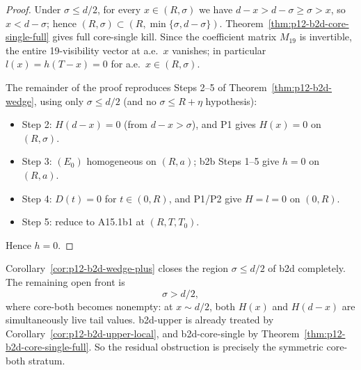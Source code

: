 \begin{proof}
Under $\sigma \le d/2$, for every $x \in (R, \sigma)$ we have
$d - x > d - \sigma \ge \sigma > x$, so $x < d - \sigma$; hence
$(R, \sigma) \subset (R, \min\{\sigma, d - \sigma\})$.
Theorem~\ref{thm:p12-b2d-core-single-full} gives full core-single
kill.  Since the coefficient matrix $M_{19}$ is invertible, the
entire 19-visibility vector at a.e.\ $x$ vanishes; in particular
$l(x) = h(T - x) = 0$ for a.e.\ $x \in (R, \sigma)$.

The remainder of the proof reproduces Steps 2--5 of
Theorem~\ref{thm:p12-b2d-wedge}, using only $\sigma \le d/2$ (and no
$\sigma \le R + \eta$ hypothesis):
\begin{itemize}
\item Step 2: $H(d - x) = 0$ (from $d - x > \sigma$), and P1 gives
  $H(x) = 0$ on $(R, \sigma)$.
\item Step 3: $(E_0)$ homogeneous on $(R, a)$; b2b Steps 1--5 give
  $h = 0$ on $(R, a)$.
\item Step 4: $D(t) = 0$ for $t \in (0, R)$, and P1/P2 give
  $H = l = 0$ on $(0, R)$.
\item Step 5: reduce to A15.1b1 at $(R, T, T_0)$.
\end{itemize}
Hence $h = 0$.
\end{proof}

\begin{remark}
\label{rem:p12-b2d-remaining}
Corollary~\ref{cor:p12-b2d-wedge-plus} closes the region
$\sigma \le d/2$ of b2d completely.  The remaining open front
is
\[
\sigma > d/2,
\]
where core-both becomes nonempty: at $x \sim d/2$, both $H(x)$
and $H(d - x)$ are simultaneously live tail values.
b2d-upper is already treated by
Corollary~\ref{cor:p12-b2d-upper-local}, and b2d-core-single by
Theorem~\ref{thm:p12-b2d-core-single-full}.  So the residual obstruction
is precisely the symmetric core-both stratum.
\end{remark}
